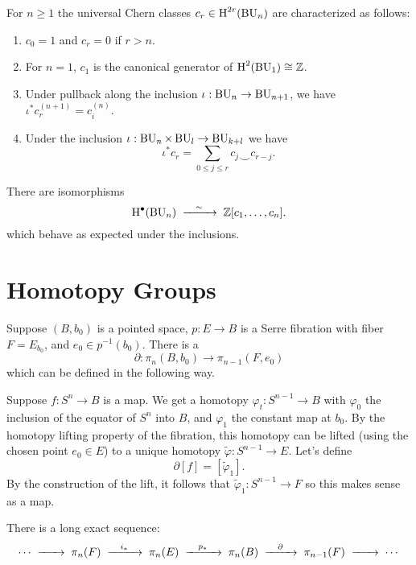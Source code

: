 \begin{definition}
	For $n\geq 1$ the universal Chern classes $c_r \in \operatorname{H}^{2r}(\operatorname{BU}_n)$
	are characterized as follows:
	\begin{enumerate}
		\item $c_0 = 1$ and $c_r = 0$ if $r > n$.
		\item For $n=1$, $c_1$ is the canonical generator of $\operatorname{H}^2(\operatorname{BU}_1)\cong \mathbb{Z}$.
		\item Under pullback along the inclusion $\iota : \operatorname{BU}_n \to \operatorname{BU}_{n+1}$, we have $\iota^* c_r^{(n+1)} = c_i^{(n)}$.
		\item Under the inclusion $\iota : \operatorname{BU}_n\times \operatorname{BU}_l \to \operatorname{BU}_{k+l}$ we have
		      \[
			      \iota^* c_r = \sum_{0\leq j \leq r} c_j \smile c_{r-j}.
		      \]
	\end{enumerate}
\end{definition}

\begin{proposition}
	There are isomorphisms
	\[
		\H^\bullet(\BU_n) \lkxisom \Z[c_1, \ldots, c_n].
	\]
	which behave as expected under the inclusions.
\end{proposition}

\section{Homotopy Groups}

Suppose $(B, b_0)$ is a pointed space, $p : E \to B$ is a Serre fibration with fiber $F=E_{b_0}$, and $e_0\in p^{-1}(b_0)$. There is a 
\[
	\partial : \pi_n(B, b_0) \to \pi_{n-1}(F, e_0)
\]
which can be defined in the following way.

Suppose $f : S^n \to B$ is a map. We get a homotopy $\varphi_t : S^{n-1} \to B$ with $\varphi_0$ the inclusion of the equator of $S^n$ into $B$, and $\varphi_1$ the constant map at $b_0$. By the homotopy lifting property of the fibration, this homotopy can be lifted (using the chosen point $e_0\in E$) to a unique homotopy $\widetilde{\varphi} : S^{n-1} \to E$. Let's define
\[
		\partial [f] = [\widetilde{\varphi}_1].
\]
By the construction of the lift, it follows that $\widetilde{\varphi}_1 : S^{n-1} \to F$ so this makes sense as a map.

\begin{theorem}
	There is a long exact sequence:
	\[
		\cdots\lkxto \pi_n(F)\lkxto[i_*]\pi_n(E)\lkxto[p_*]\pi_n(B)\lkxto[\partial]\pi_{n-1}(F)\lkxto\cdots
	\]
\end{theorem}

